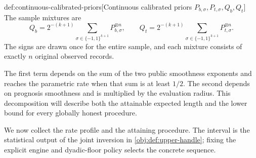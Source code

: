 \begin{definitionv}{def:continuous-calibrated-priors}[Continuous calibrated priors \(P_{b,\sigma},P_{t,\sigma},Q_b,Q_t\)]
The sample mixtures are
\[
Q_b
=
2^{-(k+1)}
\sum_{\sigma\in\{-1,1\}^{k+1}}
P_{b,\sigma}^{\otimes n},
\qquad
Q_t
=
2^{-(k+1)}
\sum_{\sigma\in\{-1,1\}^{k+1}}
P_{t,\sigma}^{\otimes n}.
\]
The signs are drawn once for the entire sample, and each mixture consists of exactly \(n\) original observed records.
\end{definitionv}


The first term depends on the sum of the two public smoothness exponents and reaches the parametric rate when that sum is at least \(1/2\). The second depends on prognosis smoothness and is multiplied by the evaluation radius. This decomposition will describe both the attainable expected length and the lower bound for every globally honest procedure.

We now collect the rate profile  and the attaining procedure. The interval  is the statistical output of the joint inversion in \cref{obj:def:upper-handle}; fixing the explicit engine and dyadic-floor policy selects the concrete sequence.


